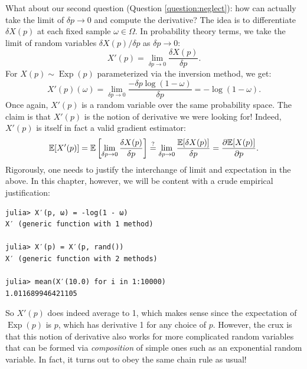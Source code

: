 What about our second question (Question \ref{question:neglect}): how can actually take the limit of $\delta p \to 0$ and compute the derivative?
The idea is to differentiate $\delta X(p)$ at each fixed sample $\omega \in \Omega$. 
In probability theory terms, we take the limit of random variables $\delta X(p) / \delta p$
as $\delta p \to 0$:
\begin{equation}
    X'(p) = \lim_{\delta p \to 0} \frac{\delta X(p)}{\delta p}.
\end{equation}
For $X(p) \sim \operatorname{Exp}(p)$ parameterized via the inversion method, we get:
\begin{equation}
    X'(p)(\omega) = \lim_{\delta p \to 0} \frac{-\delta p\log{(1-\omega)}}{\delta p} = -\log{(1-\omega)}.
\end{equation}
Once again, $X'(p)$ is a random variable over the same probability space.
The claim is that $X'(p)$ is the notion of derivative we were looking for! Indeed, $X'(p)$ is itself in fact
a valid gradient estimator:
\begin{equation}
    \mathbb E[X'(p)] = \mathbb E\left[ \lim_{\delta p \to 0} \frac{\delta X(p)}{\delta p}\right] \stackrel{?}{=} 
\lim_{\delta p \to 0} \frac{\mathbb E[\delta X(p)]}{\delta p} = 
    \frac{\partial \mathbb E[X(p)]}{\partial p}.
    \label{eq:exchange} 
 \end{equation} 
Rigorously, one needs to justify the interchange of limit and expectation in the above.
In this chapter, however, we will be content with a crude empirical justification:
\begin{verbatim}
julia> X′(p, ω) = -log(1 - ω)
X′ (generic function with 1 method)

julia> X′(p) = X′(p, rand())
X′ (generic function with 2 methods)

julia> mean(X′(10.0) for i in 1:10000)
1.011689946421105
\end{verbatim}
So $X'(p)$ does indeed average to 1, which makes sense since the expectation of $\operatorname{Exp}(p)$ is $p$, which has derivative 1 for any choice of $p$. However, 
the crux is that this notion of derivative 
also works for more complicated random variables that can be formed via \emph{composition} of simple ones such as an exponential random variable. In fact, it turns out to obey the same chain rule as usual!


